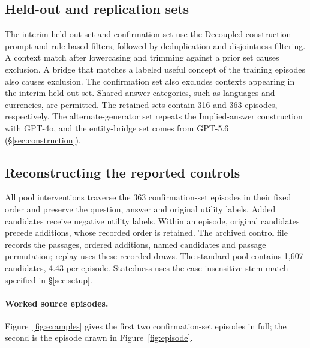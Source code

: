\subsection{Held-out and replication sets}
\label{app:fresh}

The interim held-out set and confirmation set use the Decoupled
construction prompt and rule-based filters, followed by deduplication
and disjointness filtering. A context match after lowercasing and
trimming against a prior set causes exclusion. A bridge that matches a
labeled useful concept of the training episodes also causes exclusion.
The confirmation set also excludes contexts appearing in the interim
held-out set. Shared answer categories, such as languages and
currencies, are permitted. The retained sets contain 316 and 363
episodes, respectively. The alternate-generator set repeats the
Implied-answer construction with GPT-4o, and the entity-bridge set comes
from GPT-5.6 (\S\ref{sec:construction}).

\subsection{Reconstructing the reported controls}
\label{app:pools}
\label{app:controls}

All pool interventions traverse the 363 confirmation-set episodes in
their fixed order and preserve the question, answer and original
utility labels. Added candidates receive negative utility labels.
Within an episode, original candidates precede additions, whose recorded
order is retained. The archived control file records the passages,
ordered additions, named candidates and passage permutation; replay uses
these recorded draws. The standard pool contains 1,607 candidates,
4.43 per episode. Statedness uses the case-insensitive stem match
specified in \S\ref{sec:setup}.

\paragraph{Worked source episodes.}
Figure~\ref{fig:examples} gives the first two confirmation-set episodes
in full; the second is the episode drawn in Figure~\ref{fig:episode}.

